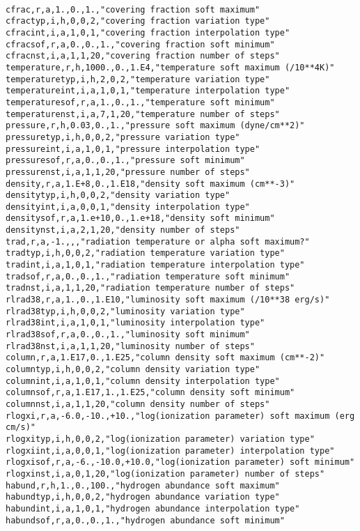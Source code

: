 \begin{verbatim}

cfrac,r,a,1.,0.,1.,"covering fraction soft maximum"
cfractyp,i,h,0,0,2,"covering fraction variation type"
cfracint,i,a,1,0,1,"covering fraction interpolation type"
cfracsof,r,a,0.,0.,1.,"covering fraction soft minimum"
cfracnst,i,a,1,1,20,"covering fraction number of steps"
temperature,r,h,1000.,0.,1.E4,"temperature soft maximum (/10**4K)"
temperaturetyp,i,h,2,0,2,"temperature variation type"
temperatureint,i,a,1,0,1,"temperature interpolation type"
temperaturesof,r,a,1.,0.,1.,"temperature soft minimum"
temperaturenst,i,a,7,1,20,"temperature number of steps"
pressure,r,h,0.03,0.,1.,"pressure soft maximum (dyne/cm**2)"
pressuretyp,i,h,0,0,2,"pressure variation type"
pressureint,i,a,1,0,1,"pressure interpolation type"
pressuresof,r,a,0.,0.,1.,"pressure soft minimum"
pressurenst,i,a,1,1,20,"pressure number of steps"
density,r,a,1.E+8,0.,1.E18,"density soft maximum (cm**-3)"
densitytyp,i,h,0,0,2,"density variation type"
densityint,i,a,0,0,1,"density interpolation type"
densitysof,r,a,1.e+10,0.,1.e+18,"density soft minimum"
densitynst,i,a,2,1,20,"density number of steps"
trad,r,a,-1.,,,"radiation temperature or alpha soft maximum?"
tradtyp,i,h,0,0,2,"radiation temperature variation type"
tradint,i,a,1,0,1,"radiation temperature interpolation type"
tradsof,r,a,0.,0.,1.,"radiation temperature soft minimum"
tradnst,i,a,1,1,20,"radiation temperature number of steps"
rlrad38,r,a,1.,0.,1.E10,"luminosity soft maximum (/10**38 erg/s)"
rlrad38typ,i,h,0,0,2,"luminosity variation type"
rlrad38int,i,a,1,0,1,"luminosity interpolation type"
rlrad38sof,r,a,0.,0.,1.,"luminosity soft minimum"
rlrad38nst,i,a,1,1,20,"luminosity number of steps"
column,r,a,1.E17,0.,1.E25,"column density soft maximum (cm**-2)"
columntyp,i,h,0,0,2,"column density variation type"
columnint,i,a,1,0,1,"column density interpolation type"
columnsof,r,a,1.E17,1.,1.E25,"column density soft minimum"
columnnst,i,a,1,1,20,"column density number of steps"
rlogxi,r,a,-6.0,-10.,+10.,"log(ionization parameter) soft maximum (erg cm/s)"
rlogxityp,i,h,0,0,2,"log(ionization parameter) variation type"
rlogxiint,i,a,0,0,1,"log(ionization parameter) interpolation type"
rlogxisof,r,a,-6.,-10.0,+10.0,"log(ionization parameter) soft minimum"
rlogxinst,i,a,0,1,20,"log(ionization parameter) number of steps"
habund,r,h,1.,0.,100.,"hydrogen abundance soft maximum"
habundtyp,i,h,0,0,2,"hydrogen abundance variation type"
habundint,i,a,1,0,1,"hydrogen abundance interpolation type"
habundsof,r,a,0.,0.,1.,"hydrogen abundance soft minimum"

\end{verbatim}

